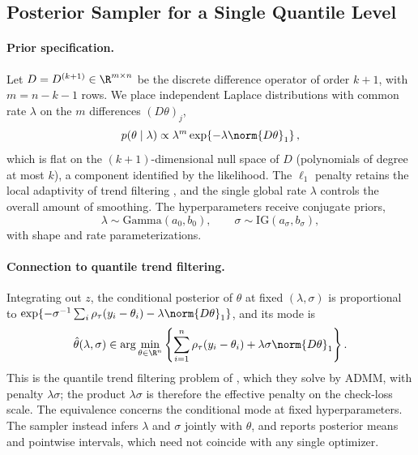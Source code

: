 \subsection{Posterior Sampler for a Single Quantile Level}
\label{subsec:individual}

\paragraph{Prior specification.} Let $D = D^{(k+1)} \in \R^{m \times n}$ be the discrete difference operator of order $k+1$, with $m = n - k - 1$ rows. We place independent Laplace distributions with common rate $\lambda$ on the $m$ differences $(D\theta)_j$,
\begin{equation}
    p(\theta \mid \lambda) \propto \lambda^{m} \exp\!\left\{-\lambda \norm{D\theta}_1\right\},
    \label{eq:prior_theta}
\end{equation}
which is flat on the $(k+1)$-dimensional null space of $D$ (polynomials of degree at most $k$), a component identified by the likelihood. The $\ell_1$ penalty retains the local adaptivity of trend filtering \citep{tibshirani2014adaptive}, and the single global rate $\lambda$ controls the overall amount of smoothing. The hyperparameters receive conjugate priors,
\begin{equation}
    \lambda \sim \mathrm{Gamma}(a_0, b_0), \qquad \sigma \sim \mathrm{IG}(a_\sigma, b_\sigma),
    \label{eq:hyperpriors}
\end{equation}
with shape and rate parameterizations.

\paragraph{Connection to quantile trend filtering.} Integrating out $z$, the conditional posterior of $\theta$ at fixed $(\lambda, \sigma)$ is proportional to $\exp\{-\sigma^{-1}\sum_i \rho_\tau(y_i-\theta_i) - \lambda\norm{D\theta}_1\}$, and its mode is
\begin{equation}
    \hat{\theta}(\lambda, \sigma) \in \arg\min_{\theta \in \R^n} \left\{ \sum_{i=1}^n \rho_\tau(y_i-\theta_i) + \lambda\sigma \norm{D\theta}_1 \right\}.
    \label{eq:map_qtf}
\end{equation}
This is the quantile trend filtering problem of \citet{brantley2020baseline}, which they solve by ADMM, with penalty $\lambda\sigma$; the product $\lambda\sigma$ is therefore the effective penalty on the check-loss scale. The equivalence concerns the conditional mode at fixed hyperparameters. The sampler instead infers $\lambda$ and $\sigma$ jointly with $\theta$, and reports posterior means and pointwise intervals, which need not coincide with any single optimizer.

